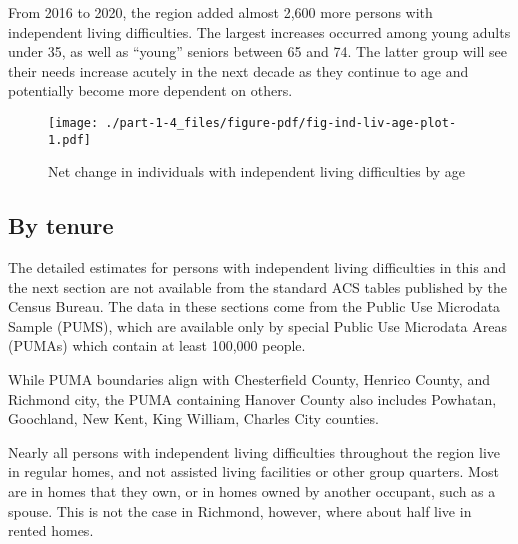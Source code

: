 \documentclass[
  letterpaper,
  DIV=11,
  numbers=noendperiod]{scrreprt}
\begin{document}
From 2016 to 2020, the region added almost 2,600 more persons with
independent living difficulties. The largest increases occurred among
young adults under 35, as well as ``young'' seniors between 65 and 74.
The latter group will see their needs increase acutely in the next
decade as they continue to age and potentially become more dependent on
others.

\begin{figure}

{\centering \texttt{[image: ./part-1-4\_files/figure-pdf/fig-ind-liv-age-plot-1.pdf]}

}

\caption{\label{fig-ind-liv-age-plot}Net change in individuals with
independent living difficulties by age}

\end{figure}

\hypertarget{by-tenure}{%
\subsection{By tenure}\label{by-tenure}}

\begin{tcolorbox}[enhanced jigsaw, colback=white, colbacktitle=quarto-callout-note-color!10!white, bottomrule=.15mm, opacitybacktitle=0.6, colframe=quarto-callout-note-color-frame, breakable, opacityback=0, bottomtitle=1mm, titlerule=0mm, coltitle=black, leftrule=.75mm, left=2mm, title=\textcolor{quarto-callout-note-color}{\faInfo}\hspace{0.5em}{Note}, toptitle=1mm, arc=.35mm, rightrule=.15mm, toprule=.15mm]
The detailed estimates for persons with independent living difficulties
in this and the next section are not available from the standard ACS
tables published by the Census Bureau. The data in these sections come
from the Public Use Microdata Sample (PUMS), which are available only by
special Public Use Microdata Areas (PUMAs) which contain at least
100,000 people.

While PUMA boundaries align with Chesterfield County, Henrico County,
and Richmond city, the PUMA containing Hanover County also includes
Powhatan, Goochland, New Kent, King William, Charles City counties.
\end{tcolorbox}

Nearly all persons with independent living difficulties throughout the
region live in regular homes, and not assisted living facilities or
other group quarters. Most are in homes that they own, or in homes owned
by another occupant, such as a spouse. This is not the case in Richmond,
however, where about half live in rented homes.
\end{document}

